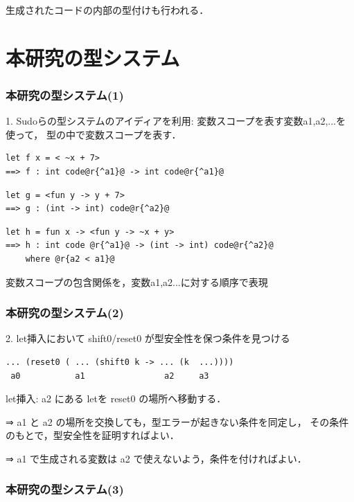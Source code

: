 \documentclass[dvipdfmx,cjk,xcolor=dvipsnames,envcountsect,notheorems,12pt]{beamer}
\theoremstyle{definition}
\begin{document}
\begin{appendix}
\begin{frame}[fragile]
  生成されたコードの内部の型付けも行われる．
\end{frame}

\section{本研究の型システム}

\begin{frame}[fragile]
  \frametitle{本研究の型システム(1)}

  1. Sudoらの型システムのアイディアを利用:
  変数スコープを表す変数a1,a2,...を使って，
  型の中で変数スコープを表す．

\begin{lstlisting}
let f x = < ~x + 7>
==> f : int code@r{^a1}@ -> int code@r{^a1}@
\end{lstlisting}
\begin{lstlisting}
let g = <fun y -> y + 7>
==> g : (int -> int) code@r{^a2}@
\end{lstlisting}
\begin{lstlisting}
let h = fun x -> <fun y -> ~x + y>
==> h : int code @r{^a1}@ -> (int -> int) code@r{^a2}@
    where @r{a2 < a1}@
\end{lstlisting}

  変数スコープの包含関係を，変数a1,a2...に対する順序で表現
\end{frame}

\begin{frame}[fragile]
  \frametitle{本研究の型システム(2)}

  2. let挿入において shift0/reset0 が型安全性を保つ条件を見つける

\begin{lstlisting}
... (reset0 ( ... (shift0 k -> ... (k  ...))))
 a0           a1                a2     a3
\end{lstlisting}

  \medskip

  let挿入: a2 にある letを reset0 の場所へ移動する．

  \medskip
  ⇒ a1 と a2 の場所を交換しても，型エラーが起きない条件を同定し，
  その条件のもとで，型安全性を証明すればよい．

  \medskip
  ⇒ a1 で生成される変数は a2 で使えないよう，条件を付ければよい．

\end{frame}

\begin{frame}[fragile]
  \frametitle{本研究の型システム(3)}


\end{frame}
\end{appendix}
\end{document}
